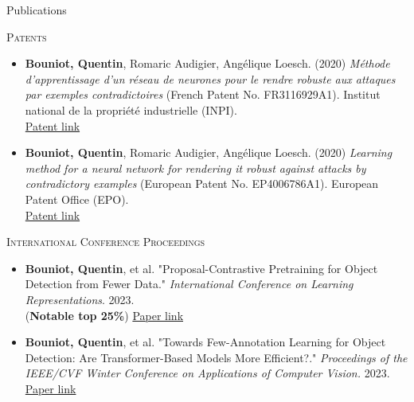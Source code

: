 \documentclass{resume} %
\begin{document}

    \begin{rSection}{Publications}

    \textsc{Patents}

    \begin{itemize}[label=$\cdot$]
        \item \textbf{Bouniot, Quentin}, Romaric Audigier, Angélique Loesch. (2020) \emph{Méthode d'apprentissage d'un réseau de neurones pour le rendre robuste aux attaques par exemples contradictoires} (French Patent No. FR3116929A1). Institut national de la propriété industrielle (INPI). \\
        \href{https://data.inpi.fr/brevets/FR3116929}{Patent link}

        \item \textbf{Bouniot, Quentin}, Romaric Audigier, Angélique Loesch. (2020) \emph{Learning method for a neural network for rendering it robust against attacks by contradictory examples} (European Patent No. EP4006786A1). European Patent Office (EPO). \\ \href{https://worldwide.espacenet.com/publicationDetails/description?DB=&ND=3&bcId=0&locale=fr_EP&return=true&FT=D&date=20220601&CC=EP&NR=4006786A1&KC=A1#}{Patent link}
    \end{itemize}

    \textsc{International Conference Proceedings}

    \begin{itemize}[label=$\cdot$]
        \item \textbf{Bouniot, Quentin}, et al. "Proposal-Contrastive Pretraining for Object Detection from Fewer Data." \emph{International Conference on Learning Representations}. 2023. \\ (\textbf{Notable top 25\%}) \href{https://openreview.net/forum?id=gm0VZ-h-hPy}{Paper link}

        \item \textbf{Bouniot, Quentin}, et al. "Towards Few-Annotation Learning for Object Detection: Are Transformer-Based Models More Efficient?." \emph{Proceedings of the IEEE/CVF Winter Conference on Applications of Computer Vision.} 2023. \\ \href{https://openaccess.thecvf.com/content/WACV2023/html/Bouniot_Towards_Few-Annotation_Learning_for_Object_Detection_Are_Transformer-Based_Models_More_WACV_2023_paper.html}{Paper link}


\end{itemize}
\end{rSection}
\end{document}
